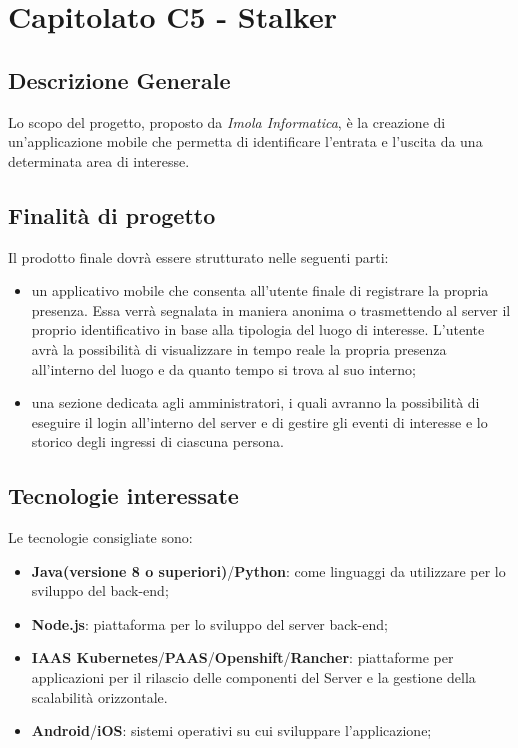 \section{Capitolato C5 - Stalker}
\subsection{Descrizione Generale}
Lo scopo del progetto, proposto da \textit{Imola Informatica}, è la creazione di un'applicazione mobile che permetta di identificare l'entrata e l'uscita da una determinata area di interesse.
\subsection{Finalità di progetto}
Il prodotto finale dovrà essere strutturato nelle seguenti parti:
\begin{itemize}
	\item un applicativo mobile che consenta all'utente finale di registrare la propria presenza. Essa verrà segnalata in maniera anonima o trasmettendo al server il proprio identificativo in base alla tipologia del luogo di interesse. L'utente avrà la possibilità di visualizzare in tempo reale la propria presenza all'interno del luogo e da quanto tempo si trova al suo interno;
	\item una sezione dedicata agli amministratori, i quali avranno la possibilità di eseguire il login all'interno del server e di gestire gli eventi di interesse e lo storico degli ingressi di ciascuna persona.
\end{itemize}
\subsection{Tecnologie interessate}
Le tecnologie consigliate sono:
\begin{itemize}
	\item \textbf{Java\glos(versione 8 o superiori)}/\textbf{Python\glos}: come linguaggi da utilizzare per lo sviluppo del back-end;
	\item \textbf{Node.js\glos}: piattaforma per lo sviluppo del server back-end;
	\item \textbf{IAAS Kubernetes\glos}/\textbf{PAAS\glos}/\textbf{Openshift\glos}/\textbf{Rancher\glos}: piattaforme per applicazioni per il rilascio delle componenti del Server e la gestione della scalabilità orizzontale.
	\item \textbf{Android\glos}/\textbf{iOS\glos}: sistemi operativi su cui sviluppare l'applicazione;
\end{itemize}
